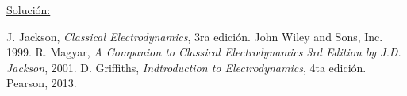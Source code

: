 \documentclass[a4paper,11pt]{article}
\numberwithin{equation}{section}
\begin{document}
\vspace{.3cm}

\underline{Solución:} \vspace{.3cm}

\newpage

\begin{thebibliography}{10}
J. Jackson, \emph{Classical Electrodynamics}, 3ra edición. John Wiley and Sons, Inc. 
1999.
R. Magyar, \emph{A Companion to Classical Electrodynamics 3rd Edition by J.D. 
Jackson}, 2001.
D. Griffiths, \emph{Indtroduction to Electrodynamics}, 4ta edición. Pearson, 2013.
\end{thebibliography}
\end{document}
